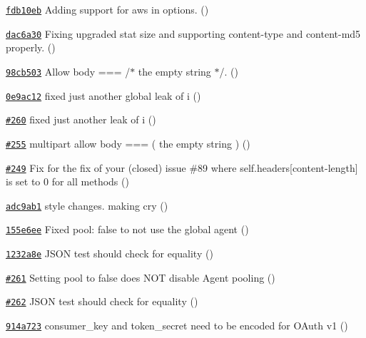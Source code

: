 \begin{DoxyItemize}
\item \href{https://github.com/mikeal/request/commit/fdb10eb493110b8e6e4f679524f38cef946e3f08}{\tt fdb10eb} Adding support for aws in options. ()
\item \href{https://github.com/mikeal/request/commit/dac6a301ae03207af88fae6f5017e82157b79b41}{\tt dac6a30} Fixing upgraded stat size and supporting content-\/type and content-\/md5 properly. ()
\item \href{https://github.com/mikeal/request/commit/98cb50325e1d7789fd9f44523d2315df5f890d10}{\tt 98cb503} Allow body === \textquotesingle{}\textquotesingle{} /$\ast$ the empty string $\ast$/. ()
\item \href{https://github.com/mikeal/request/commit/0e9ac12c69aaca370fbca94b41358e1c3a2f6170}{\tt 0e9ac12} fixed just another global leak of i ()
\item \href{https://github.com/mikeal/request/pull/260}{\tt \#260} fixed just another leak of \textquotesingle{}i\textquotesingle{} ()
\item \href{https://github.com/mikeal/request/pull/255}{\tt \#255} multipart allow body === \textquotesingle{}\textquotesingle{} ( the empty string ) ()
\item \href{https://github.com/mikeal/request/pull/249}{\tt \#249} Fix for the fix of your (closed) issue \#89 where self.\+headers\mbox{[}content-\/length\mbox{]} is set to 0 for all methods ()
\item \href{https://github.com/mikeal/request/commit/adc9ab1f563f3cb4681ac8241fcc75e6099efde2}{\tt adc9ab1} style changes. making  cry ()
\item \href{https://github.com/mikeal/request/commit/155e6ee270924d5698d3fea37cefc1926cbaf998}{\tt 155e6ee} Fixed {\ttfamily pool\+: false} to not use the global agent ()
\item \href{https://github.com/mikeal/request/commit/1232a8e46752619d4d4b51d558e6725faf7bf3aa}{\tt 1232a8e} J\+S\+O\+N test should check for equality ()
\item \href{https://github.com/mikeal/request/pull/261}{\tt \#261} Setting \textquotesingle{}pool\textquotesingle{} to \textquotesingle{}false\textquotesingle{} does N\+O\+T disable Agent pooling ()
\item \href{https://github.com/mikeal/request/pull/262}{\tt \#262} J\+S\+O\+N test should check for equality ()
\item \href{https://github.com/mikeal/request/commit/914a72300702a78a08263fe98a43d25e25713a70}{\tt 914a723} consumer\+\_\+key and token\+\_\+secret need to be encoded for O\+Auth v1 ()

\end{DoxyItemize}
